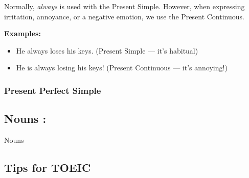 \documentclass[11pt,a4paper]{article}
\begin{document}
Normally, \textit{always} is used with the Present Simple.  
However, when expressing irritation, annoyance, or a negative emotion, we use the Present Continuous.

\textbf{Examples:}
\begin{itemize}
  \item He always loses his keys. \hfill (Present Simple — it’s habitual)
  \item He is always losing his keys! \hfill (Present Continuous — it’s annoying!)
\end{itemize}


\subsubsection{Present Perfect Simple}



\subsection{Nouns : }

Nouns


\subsection{Tips for TOEIC}
\end{document}
